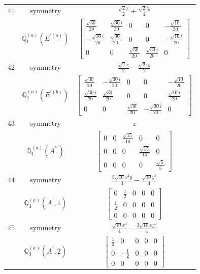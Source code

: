 \documentclass[fleqn,8pt,landscape]{jsarticle}
\begin{document}
\begin{longtable}{ccc}
$ 41 $ & $ \text{symmetry} $ & $ \frac{\sqrt{2} x}{2} + \frac{\sqrt{2} i y}{2} $ \\
$  $ & $ \mathbb{Q}_{1}^{(a)}(E^{\prime(a)}) $ & $ \begin{bmatrix} \frac{\sqrt{30}}{20} & \frac{\sqrt{30} i}{20} & 0 & 0 & - \frac{\sqrt{10}}{20} \\ - \frac{\sqrt{30} i}{20} & \frac{\sqrt{30}}{20} & 0 & 0 & - \frac{\sqrt{10} i}{20} \\ 0 & 0 & \frac{\sqrt{30}}{20} & \frac{\sqrt{30} i}{20} & 0 \end{bmatrix} $ \\ \hline
$ 42 $ & $ \text{symmetry} $ & $ \frac{\sqrt{2} x}{2} - \frac{\sqrt{2} i y}{2} $ \\
$  $ & $ \mathbb{Q}_{1}^{(a)}(E^{\prime(b)}) $ & $ \begin{bmatrix} \frac{\sqrt{30}}{20} & - \frac{\sqrt{30} i}{20} & 0 & 0 & - \frac{\sqrt{10}}{20} \\ \frac{\sqrt{30} i}{20} & \frac{\sqrt{30}}{20} & 0 & 0 & \frac{\sqrt{10} i}{20} \\ 0 & 0 & \frac{\sqrt{30}}{20} & - \frac{\sqrt{30} i}{20} & 0 \end{bmatrix} $ \\ \hline
$ 43 $ & $ \text{symmetry} $ & $ z $ \\
$  $ & $ \mathbb{Q}_{1}^{(a)}(A^{\prime\prime}) $ & $ \begin{bmatrix} 0 & 0 & \frac{\sqrt{15}}{10} & 0 & 0 \\ 0 & 0 & 0 & \frac{\sqrt{15}}{10} & 0 \\ 0 & 0 & 0 & 0 & \frac{\sqrt{5}}{5} \end{bmatrix} $ \\ \hline
$ 44 $ & $ \text{symmetry} $ & $ \frac{3 \sqrt{10} x^{2} y}{4} - \frac{\sqrt{10} y^{3}}{4} $ \\
$  $ & $ \mathbb{Q}_{3}^{(a)}(A^{\prime},1) $ & $ \begin{bmatrix} 0 & \frac{1}{2} & 0 & 0 & 0 \\ \frac{1}{2} & 0 & 0 & 0 & 0 \\ 0 & 0 & 0 & 0 & 0 \end{bmatrix} $ \\ \hline
$ 45 $ & $ \text{symmetry} $ & $ \frac{\sqrt{10} x^{3}}{4} - \frac{3 \sqrt{10} x y^{2}}{4} $ \\
$  $ & $ \mathbb{Q}_{3}^{(a)}(A^{\prime},2) $ & $ \begin{bmatrix} \frac{1}{2} & 0 & 0 & 0 & 0 \\ 0 & - \frac{1}{2} & 0 & 0 & 0 \\ 0 & 0 & 0 & 0 & 0 \end{bmatrix} $ \\ \hline

\end{longtable}
\end{document}
